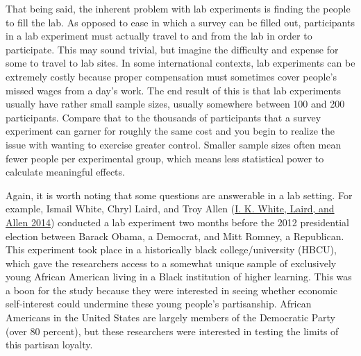 \documentclass{book}
\begin{document}
That being said, the inherent problem with lab experiments is finding the
people to fill the lab. As opposed to ease in which a survey can be filled
out, participants in a lab experiment must actually travel to and from the lab
in order to participate. This may sound trivial, but imagine the difficulty
and expense for some to travel to lab sites. In some international contexts,
lab experiments can be extremely costly because proper compensation must
sometimes cover people's missed wages from a day's work. The end result of
this is that lab experiments usually have rather small sample sizes, usually
somewhere between 100 and 200 participants. Compare that to the thousands of
participants that a survey experiment can garner for roughly the same cost and
you begin to realize the issue with wanting to exercise greater control.
Smaller sample sizes often mean fewer people per experimental group, which
means less statistical power to calculate meaningful effects.

Again, it is worth noting that some questions are answerable in a lab setting.
For example, Ismail White, Chryl Laird, and Troy Allen
(\protect\hyperlink{ref-white_selling_2014}{I. K. White, Laird, and Allen
2014}) conducted a lab experiment two months before the 2012 presidential
election between Barack Obama, a Democrat, and Mitt Romney, a Republican. This
experiment took place in a historically black college/university (HBCU), which
gave the researchers access to a somewhat unique sample of exclusively young
African American living in a Black institution of higher learning. This was a
boon for the study because they were interested in seeing whether economic
self-interest could undermine these young people's partisanship. African
Americans in the United States are largely members of the Democratic Party
(over 80 percent), but these researchers were interested in testing the limits
of this partisan loyalty.
\end{document}
